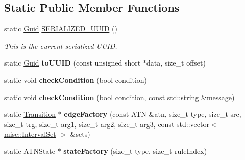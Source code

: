 \subsection*{Static Public Member Functions}
\begin{DoxyCompactItemize}
\item 
\mbox{\label{classantlr4_1_1atn_1_1ATNDeserializer_a00524eaade634ca63a4c5fe3d65a9b75}} 
static \hyperlink{classGuid}{Guid} \hyperlink{classantlr4_1_1atn_1_1ATNDeserializer_a00524eaade634ca63a4c5fe3d65a9b75}{S\+E\+R\+I\+A\+L\+I\+Z\+E\+D\+\_\+\+U\+U\+ID} ()
\begin{DoxyCompactList}\small\item\em This is the current serialized U\+U\+ID. \end{DoxyCompactList}\item 
\mbox{\label{classantlr4_1_1atn_1_1ATNDeserializer_aa995f4f04abbad84a72ede0aa2affbdb}} 
static \hyperlink{classGuid}{Guid} {\bfseries to\+U\+U\+ID} (const unsigned short $\ast$data, size\+\_\+t offset)
\item 
\mbox{\label{classantlr4_1_1atn_1_1ATNDeserializer_acc8c93e4b176da3869d143f1e01960cc}} 
static void {\bfseries check\+Condition} (bool condition)
\item 
\mbox{\label{classantlr4_1_1atn_1_1ATNDeserializer_acbc323b929a3afac1a4dffbda33dca6b}} 
static void {\bfseries check\+Condition} (bool condition, const std\+::string \&message)
\item 
\mbox{\label{classantlr4_1_1atn_1_1ATNDeserializer_a42f8e8a738438bb7320be3e0db340fea}} 
static \hyperlink{classantlr4_1_1atn_1_1Transition}{Transition} $\ast$ {\bfseries edge\+Factory} (const A\+TN \&atn, size\+\_\+t type, size\+\_\+t src, size\+\_\+t trg, size\+\_\+t arg1, size\+\_\+t arg2, size\+\_\+t arg3, const std\+::vector$<$ \hyperlink{classantlr4_1_1misc_1_1IntervalSet}{misc\+::\+Interval\+Set} $>$ \&sets)
\item 
\mbox{\label{classantlr4_1_1atn_1_1ATNDeserializer_a1942c23ca9c2b004374dfcf55f8a5bb3}} 
static A\+T\+N\+State $\ast$ {\bfseries state\+Factory} (size\+\_\+t type, size\+\_\+t rule\+Index)
\end{DoxyCompactItemize}
